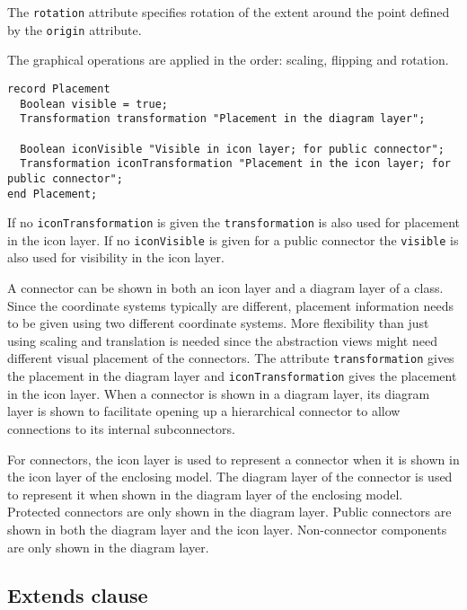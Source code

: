 The \lstinline!rotation! attribute specifies rotation of the extent around the point
defined by the \lstinline!origin! attribute.

The graphical operations are applied in the order: scaling, flipping and
rotation.

\begin{lstlisting}[language=modelica]
record Placement
  Boolean visible = true;
  Transformation transformation "Placement in the diagram layer";

  Boolean iconVisible "Visible in icon layer; for public connector";
  Transformation iconTransformation "Placement in the icon layer; for public connector";
end Placement;
\end{lstlisting}
If no \lstinline!iconTransformation! is given the \lstinline!transformation! is also used for
placement in the icon layer. If no \lstinline!iconVisible! is given for a public connector the
\lstinline!visible! is also used for visibility in the icon layer.

\begin{nonnormative}
A connector can be shown in both an icon layer and a diagram
layer of a class. Since the coordinate systems typically are different,
placement information needs to be given using two different coordinate
systems. More flexibility than just using scaling and translation is
needed since the abstraction views might need different visual placement
of the connectors. The attribute \lstinline!transformation! gives the placement in
the diagram layer and \lstinline!iconTransformation! gives the placement in the icon
layer. When a connector is shown in a diagram layer, its diagram layer
is shown to facilitate opening up a hierarchical connector to allow
connections to its internal subconnectors.
\end{nonnormative}

For connectors, the icon layer is used to represent a connector when it
is shown in the icon layer of the enclosing model. The diagram layer of
the connector is used to represent it when shown in the diagram layer of
the enclosing model. Protected connectors are only shown in the diagram
layer. Public connectors are shown in both the diagram layer and the
icon layer. Non-connector components are only shown in the diagram
layer.

\subsection{Extends clause}\label{extends-clause}


